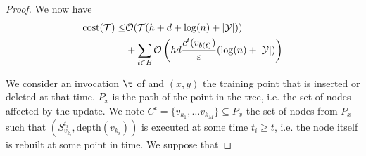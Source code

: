 \begin{proof}
    We now have
    \begin{equation}
        \begin{split}
            \text{cost}(\mathcal{T}) \leq &\mathcal{O}(\mathcal{T}(h + d + \log(n) + |\mathcal{Y}|))\\
            & + \sum_{t \in B} \mathcal{O}\left(hd\frac{c^t(v_{b(t)})}{\varepsilon}(\log(n) + |\mathcal{Y}|)\right)
        \end{split}
    \end{equation}

    We consider an invocation $\t$ of \AlgoUpdate{} and $(x,y)$ the training point that is inserted or deleted at that time. $P_x$ is the path of the point in the tree, i.e. the set of nodes affected by the update. We note $C^t = \{v_{k_1}, \dots v_{k_M}\} \subseteq P_x$ the set of nodes from $P_x$ such that \AlgoBuild{}$(S^{t_i}_{v_{k_i}}, \text{depth}(v_{k_i}))$ is executed at some time $t_i \geq t$, i.e. the node itself is rebuilt at some point in time. We suppose that 
\end{proof}






